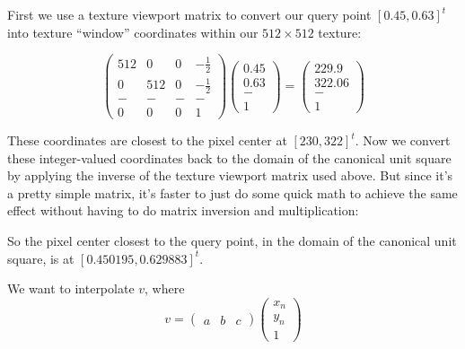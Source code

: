 \documentclass[11pt]{tingpset}
\begin{document}

  First we use a texture viewport matrix to convert our query point $[0.45, 0.63]^t$ into texture ``window'' coordinates within our $512 \times 512$ texture:

  \[
    \begin{pmatrix}
      512 & 0 & 0 & -\frac{1}{2} \\
      0 & 512 & 0 & -\frac{1}{2} \\
      - & - & - & - \\
      0 & 0 & 0 & 1
    \end{pmatrix}
    \begin{pmatrix}
      0.45 \\
      0.63 \\
      - \\
      1
    \end{pmatrix}
    =
    \begin{pmatrix}
      229.9 \\
      322.06 \\
      - \\
      1
    \end{pmatrix}
  \]

  These coordinates are closest to the pixel center at $[230, 322]^t$. Now we convert these integer-valued coordinates back to the domain of the canonical unit square by applying the inverse of the texture viewport matrix used above. But since it's a pretty simple matrix, it's faster to just do some quick math to achieve the same effect without having to do matrix inversion and multiplication:


  So the pixel center closest to the query point, in the domain of the canonical unit square, is at $[0.450195, 0.629883]^t$.

  \pagebreak
    We want to interpolate $v$, where
    \[
      v =
        \begin{pmatrix}
          a & b & c
        \end{pmatrix}
        \begin{pmatrix}
          x_n \\
          y_n \\
          1
        \end{pmatrix}
    \]
\end{document}
